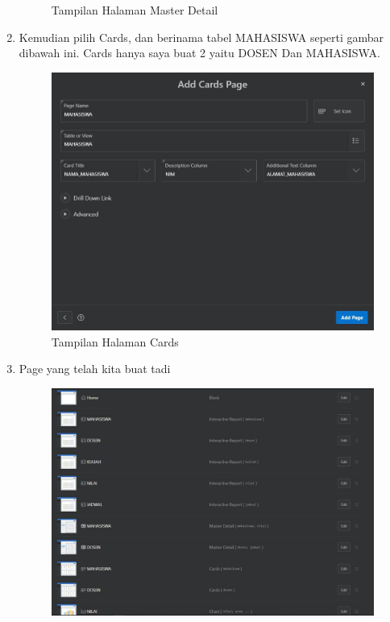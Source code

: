 \begin{enumerate}
\begin{figure}[!htbp]
\begin{center}
    \caption{Tampilan Halaman Master Detail}
    \end{center}   
    \end{figure} 
\item Kemudian pilih Cards, dan berinama tabel MAHASISWA seperti gambar dibawah ini. Cards hanya saya buat 2 yaitu DOSEN Dan MAHASISWA.
    \begin{figure}[!htbp]
    \begin{center}
    \includegraphics[scale=0.5]{section/ICA44.JPG}
    \caption{Tampilan Halaman Cards}
    \end{center}   
    \end{figure} 
\item Page yang telah kita buat tadi
    \begin{figure}[!htbp]
    \begin{center}
    \includegraphics[scale=0.5]{section/ICA47.JPG}

\end{center}
\end{figure}
\end{enumerate}
